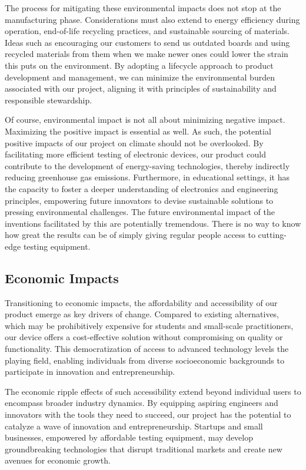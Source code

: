 The process for mitigating these environmental impacts does not stop at the manufacturing phase. Considerations must also extend to energy efficiency during operation, end-of-life recycling practices, and sustainable sourcing of materials. Ideas such as encouraging our customers to send us outdated boards and using recycled materials from them when we make newer ones could lower the strain this puts on the environment. By adopting a lifecycle approach to product development and management, we can minimize the environmental burden associated with our project, aligning it with principles of sustainability and responsible stewardship.

Of course, environmental impact is not all about minimizing negative impact. Maximizing the positive impact is essential as well. As such, the potential positive impacts of our project on climate should not be overlooked. By facilitating more efficient testing of electronic devices, our product could contribute to the development of energy-saving technologies, thereby indirectly reducing greenhouse gas emissions. Furthermore, in educational settings, it has the capacity to foster a deeper understanding of electronics and engineering principles, empowering future innovators to devise sustainable solutions to pressing environmental challenges. The future environmental impact of the inventions facilitated by this are potentially tremendous. There is no way to know how great the results can be of simply giving regular people access to cutting-edge testing equipment.

\subsection{Economic Impacts}

Transitioning to economic impacts, the affordability and accessibility of our product emerge as key drivers of change. Compared to existing alternatives, which may be prohibitively expensive for students and small-scale practitioners, our device offers a cost-effective solution without compromising on quality or functionality. This democratization of access to advanced technology levels the playing field, enabling individuals from diverse socioeconomic backgrounds to participate in innovation and entrepreneurship.

The economic ripple effects of such accessibility extend beyond individual users to encompass broader industry dynamics. By equipping aspiring engineers and innovators with the tools they need to succeed, our project has the potential to catalyze a wave of innovation and entrepreneurship. Startups and small businesses, empowered by affordable testing equipment, may develop groundbreaking technologies that disrupt traditional markets and create new avenues for economic growth.

